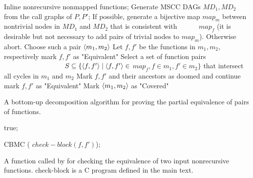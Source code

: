 \begin{algorithm}
\begin{algorithmic}[1]
\State \label{step:inline} Inline nonrecursive nonmapped functions;
\State \label{step:generate} Generate MSCC DAGs $MD_1, MD_2$
          from the call graphs of $P,P'$;
\State If possible,\label{step:possible} generate a bijective map $map_m$ between nontrivial nodes in $MD_1$ and $MD_2$ that is consistent with 
\mbox{~~~~~} $map_f$ (it is desirable but not necessary to add pairs of trivial nodes to $map_m$). Otherwise abort.
 \label{step:while}
  \State \label{step:choose} Choose such a pair $\langle m_1,m_2\rangle$
   \label{step:m1}
    \State Let $f,f'$ be the functions in $m_1,m_2$, respectively
     \label{step:Check}
          {mark $f,f'$ as "Equivalent" }
    \EndIf \label{step:m1endIf}
    \Else
      \State \label{step:select}Select a set of function pairs \newline \mbox{~~~~~~~~~~~~~~~~~} $S \subseteq \{\langle f,f'\rangle\mid \langle f,f'\rangle \in$ $map_f, f \in m_1, f' \in m_2\}$ that intersect all cycles in $m_1$ and $m_2$
      \label{step:forall}
        \label{step:abort}{Mark $f,f'$ and their ancestors as doomed and continue } 
        \EndIf
      \EndFor
       \label{step:forall2}
         mark $f,f'$ as "Equivalent"
      \EndFor
  \EndIf \label{step:selectEnd}
\State \label{step:mark} Mark $\langle m_1,m_2\rangle$ as "Covered"
\EndWhile
\EndFunction
\end{algorithmic}
\caption{A bottom-up decomposition algorithm for proving the partial equivalence of pairs of functions.}
\label{alg:OriginalProve}
\end{algorithm}


\begin{algorithm}
\begin{algorithmic}[1]


 true;

\EndIf

 CBMC ( $check-block (f,f')$);

\EndFunction
\end{algorithmic}
\caption{A function called by  for checking the equivalence of two
input nonrecursive functions. check-block is a C program defined in the main text.}
\label{alg:Check}
\end{algorithm}

